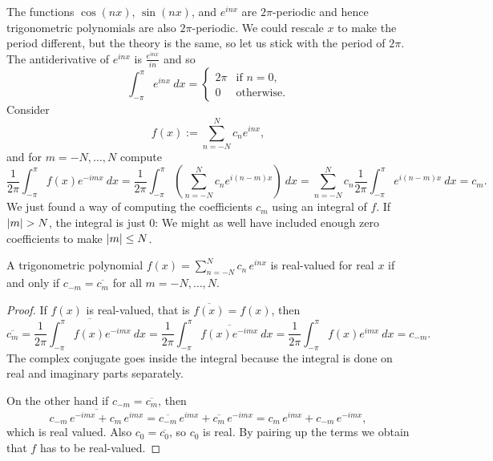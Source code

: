 \medskip

The functions $\cos (nx)$, $\sin (nx)$, and $e^{inx}$ are $2\pi$-periodic
and hence trigonometric
polynomials are also $2\pi$-periodic.
We could rescale $x$ to make the period different, but the theory is the
same, so let us stick with the period of $2\pi$.
The antiderivative of $e^{inx}$ is $\frac{e^{inx}}{in}$ and
so
\begin{equation*}
\int_{-\pi}^\pi e^{inx} ~ dx =
\begin{cases}
2\pi & \text{if } n=0, \\
0    & \text{otherwise.}
\end{cases}
\end{equation*}
Consider
\begin{equation*}
f(x) := \sum_{n=-N}^N c_n e^{inx} ,
\end{equation*}
and for $m=-N,\ldots,N$ compute
\begin{equation*}
\frac{1}{2\pi} \int_{-\pi}^\pi
f(x) e^{-imx} ~ dx
=
\frac{1}{2\pi} \int_{-\pi}^\pi
\left(\sum_{n=-N}^N c_n e^{i(n-m)x}\right) ~ dx
=
\sum_{n=-N}^N
c_n
\frac{1}{2\pi}
\int_{-\pi}^\pi
e^{i(n-m)x}
 ~ dx
=
c_m .
\end{equation*}
We just found a way of computing the coefficients $c_m$ using an integral
of $f$.  If $\lvert {m} \rvert > N$, the integral is just 0: We might as
well have included enough zero coefficients to make $\lvert {m} \rvert \leq N$.

\begin{prop}
A trigonometric polynomial
$f(x) = \sum_{n=-N}^N c_n\, e^{inx}$
is real-valued for real $x$ if
and only if $c_{-m} = \overline{c_m}$ for all $m=-N,\ldots,N$.
\end{prop}

\begin{proof}
If $f(x)$ is real-valued, that is $\overline{f(x)} = f(x)$, then
\begin{equation*}
\overline{c_m}
=
\overline{
\frac{1}{2\pi} \int_{-\pi}^\pi
f(x) e^{-imx} ~ dx
}
=
\frac{1}{2\pi} \int_{-\pi}^\pi
\overline{
f(x) e^{-imx} } ~ dx
=
\frac{1}{2\pi} \int_{-\pi}^\pi
f(x) e^{imx} ~ dx
= c_{-m} .
\end{equation*}
The complex conjugate goes inside the integral because the integral is
done on real and imaginary parts separately.

On the other hand if 
$c_{-m} = \overline{c_m}$, then
\begin{equation*}
\overline{c_{-m}\, e^{-imx}+ c_{m}\, e^{imx}}
=
\overline{c_{-m}}\, e^{imx}+ \overline{c_{m}}\, e^{-imx}
=
c_{m}\, e^{imx}+ c_{-m}\, e^{-imx} ,
\end{equation*}
which is real valued.  Also $c_0 = \overline{c_0}$, so
$c_0$ is real.
By pairing up the terms we obtain that $f$ has to be real-valued.
\end{proof}

